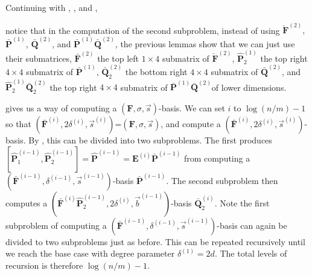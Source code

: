 \begin{exmp}
Continuing with , ,
and , %
\begin{comment}
notice that after the first subproblem, the second subproblem of computing
$\bar{\mathbf{Q}}^{(2)}$ in \prettyref{exm:subproblems} is really
a smaller problem of computing the lower right $4\times4$ submatrix
$\bar{\mathbf{Q}}_{2}^{(2)}$, which is a $(\bar{\mathbf{F}}^{\left(2\right)}\hat{\mathbf{P}}_{2}^{\left(1\right)},8,\vec{b}^{\left(1\right)})$-basis
(or equivalently a $(\check{\mathbf{F}}^{\left(2\right)}\bar{\mathbf{P}}_{2}^{\left(1\right)},[8,4,4],\vec{b}^{\left(1\right)})$-basis),
where $\bar{\mathbf{P}}_{2}^{\left(1\right)}$ is the last $4$ columns
of $\bar{\mathbf{P}}^{(1)}$, $\vec{b}^{(1)}=[2,3,3,3]$ is the list
of column degrees of $\bar{\mathbf{P}}_{2}^{(1)}$, and $\hat{\mathbf{P}}_{2}^{\left(1\right)}$
is the first $4$ rows of $\bar{\mathbf{P}}_{2}^{(1)}$. 
\end{comment}
{}notice that in the computation of the second subproblem, instead of
using $\check{\mathbf{F}}^{\left(2\right)},$ $\bar{\mathbf{P}}^{\left(1\right)}$,
$\bar{\mathbf{Q}}^{(2)}$, and $\bar{\mathbf{P}}^{(1)}\bar{\mathbf{Q}}^{(2)}$,
the previous lemmas show that we can just use their submatrices, $\bar{\mathbf{F}}^{(2)}$
the top left $1\times4$ submatrix of $\check{\mathbf{F}}^{\left(2\right)}$,
$\hat{\mathbf{P}}_{2}^{(1)}$ the top right $4\times4$ submatrix
of $\bar{\mathbf{P}}^{(1)}$, $\bar{\mathbf{Q}}_{2}^{(2)}$ the bottom
right $4\times4$ submatrix of $\bar{\mathbf{Q}}^{(2)}$, and $\hat{\mathbf{P}}_{2}^{(1)}\bar{\mathbf{Q}}_{2}^{(2)}$
the top right $4\times4$ submatrix of $\bar{\mathbf{P}}^{(1)}\bar{\mathbf{Q}}^{(2)}$of
lower dimensions. 
\end{exmp}
 gives us a way of computing
a $\left(\mathbf{F},\sigma,\vec{s}\right)$-basis. We can set $i$
to $\log\left(n/m\right)-1$ so that $(\bar{\mathbf{F}}^{\left(i\right)},2\delta^{\left(i\right)},\vec{s}^{\left(i\right)})$=$\left(\mathbf{F},\sigma,\vec{s}\right)$,
and compute a $(\bar{\mathbf{F}}^{\left(i\right)},2\delta^{\left(i\right)},\vec{s}^{\left(i\right)})$-basis.
By , this can be divided into
two subproblems. The first produces $[\hat{\mathbf{P}}_{1}^{\left(i-1\right)},\hat{\mathbf{P}}_{2}^{\left(i-1\right)}]=\hat{\mathbf{P}}^{\left(i-1\right)}=\mathbf{E}^{\left(i\right)}\bar{\mathbf{P}}^{\left(i-1\right)}$
from computing a $(\bar{\mathbf{F}}^{\left(i-1\right)},\delta^{\left(i-1\right)},\vec{s}^{\left(i-1\right)})$-basis
$\bar{\mathbf{P}}^{\left(i-1\right)}$. The second subproblem then
computes a $(\bar{\mathbf{F}}^{\left(i\right)}\hat{\mathbf{P}}_{2}^{\left(i-1\right)},2\delta^{\left(i\right)},\vec{b}^{\left(i-1\right)})$-basis
$\bar{\mathbf{Q}}_{2}^{\left(i\right)}$. Note the first subproblem
of computing a $(\bar{\mathbf{F}}^{\left(i-1\right)},\delta^{\left(i-1\right)},\vec{s}^{\left(i-1\right)})$-basis
can again be divided to two subproblems just as before. This can be
repeated recursively until we reach the base case with degree parameter
$\delta^{\left(1\right)}=2d$. The total levels of recursion is therefore
$\log\left(n/m\right)-1$.

